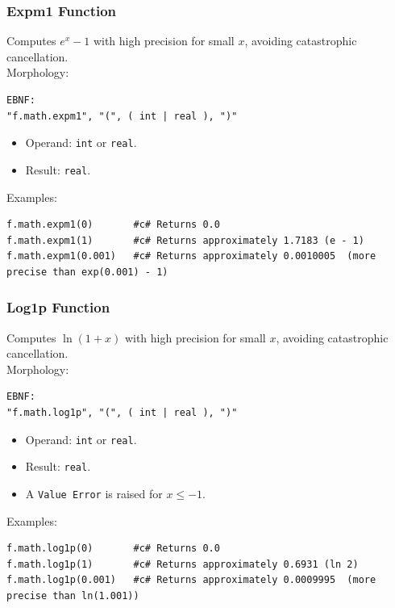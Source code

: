 \subsubsection{Expm1 Function}
Computes $e^x - 1$ with high precision for small $x$, avoiding catastrophic cancellation. \\
Morphology:
\begin{verbatim}
EBNF:
"f.math.expm1", "(", ( int | real ), ")"
\end{verbatim}
\begin{itemize}
\item Operand: \texttt{int} or \texttt{real}.
\item Result: \texttt{real}.
\end{itemize}
Examples:
\begin{verbatim}
f.math.expm1(0)       #c# Returns 0.0
f.math.expm1(1)       #c# Returns approximately 1.7183 (e - 1)
f.math.expm1(0.001)   #c# Returns approximately 0.0010005  (more precise than exp(0.001) - 1)
\end{verbatim}

\subsubsection{Log1p Function}
Computes $\ln(1 + x)$ with high precision for small $x$, avoiding catastrophic cancellation. \\
Morphology:
\begin{verbatim}
EBNF:
"f.math.log1p", "(", ( int | real ), ")"
\end{verbatim}
\begin{itemize}
\item Operand: \texttt{int} or \texttt{real}.
\item Result: \texttt{real}.
\item A \texttt{Value Error} is raised for $x \leq -1$.
\end{itemize}
Examples:
\begin{verbatim}
f.math.log1p(0)       #c# Returns 0.0
f.math.log1p(1)       #c# Returns approximately 0.6931 (ln 2)
f.math.log1p(0.001)   #c# Returns approximately 0.0009995  (more precise than ln(1.001))
\end{verbatim}

\label{sec:complex_functions}

